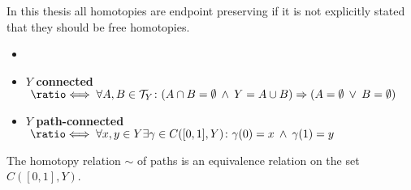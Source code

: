 In this thesis all homotopies are endpoint preserving if it is not explicitly stated that they should be free homotopies.

\begin{defin} \label{def:connectedness}
  \begin{itemize}
    \item[] %
    \item $Y$ \textbf{connected} $\;\longeq\; \forall A,B \in \T_Y\colon (A \cap B = \emptyset \: \land \: Y = A \cup B) \Rightarrow (A = \emptyset \: \lor \: B = \emptyset)$
    \item $Y$ \textbf{path-connected} $\;\longeq\; \forall x,y \in Y \exists\gamma \in C([0,1], Y)\colon \gamma(0) = x \: \land \: \gamma(1) = y$
  \end{itemize}
\end{defin}

\begin{lemma} \label{lem:homotopy-equivalence}
  The homotopy relation $\sim$ of paths is an equivalence relation on the set $C([0,1],Y)$.
\end{lemma}

